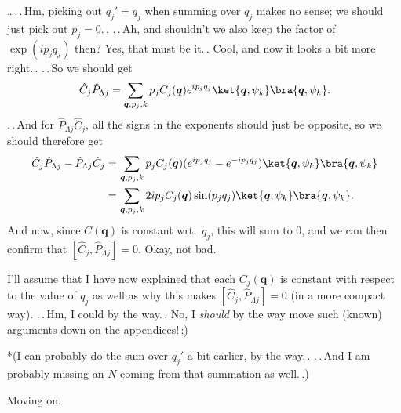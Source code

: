 \documentclass{report}
\begin{document}
\ldots .\,.\,Hm, picking out $q_j' = q_j$ when summing over $q_j$ makes no sense; we should just pick out $p_j = 0$.\,. .\,.\,Ah, and shouldn't we also keep the factor of $\exp(i p_j q_j)$ then? Yes, that must be it.\,. Cool, and now it looks a bit more right.\,. .\,.\,So we should get
\begin{align}
\begin{aligned}
	\hat C_{j} \hat P_{\Lambda j} = 
		\sum_{\boldsymbol{q}, p_j, k}
		p_j C_j(\boldsymbol{q}) e^{i p_j q_j}
		\ket{\boldsymbol{q}, \psi_{k}}
		\bra{\boldsymbol{q}, \psi_{k}}.
\end{aligned}
\end{align} 
.\,.\,And for $\hat P_{\Lambda j} \hat C_{j}$, all the signs in the exponents should just be opposite, so we should therefore get
\begin{align}
\begin{aligned}
	\hat C_{j} \hat P_{\Lambda j} - \hat P_{\Lambda j} \hat C_{j} =&\,
		\sum_{\boldsymbol{q}, p_j, k}
		p_j C_j(\boldsymbol{q}) (e^{i p_j q_j} - e^{-i p_j q_j} )
		\ket{\boldsymbol{q}, \psi_{k}}
		\bra{\boldsymbol{q}, \psi_{k}} 
	\\=&\,
		\sum_{\boldsymbol{q}, p_j, k}
		2i p_j C_j(\boldsymbol{q}) \sin(p_j q_j)
		\ket{\boldsymbol{q}, \psi_{k}}
		\bra{\boldsymbol{q}, \psi_{k}}.
\end{aligned}
\end{align} 
And now, since $C(\boldsymbol{q})$ is constant wrt.\ $q_j$, this will sum to 0, and we can then confirm that $[\hat C_{j}, \hat P_{\Lambda j}] = 0$. Okay, not bad. 

I'll assume that I have now explained that each $C_j(\boldsymbol{q})$ is constant with respect to the value of $q_j$ as well as why this makes $[\hat C_{j}, \hat P_{\Lambda j}] = 0$ (in a more compact way).
.\,.\,Hm, I could by the way.\,. No, I \emph{should} by the way move such (known) arguments down on the appendices!\,:) 

*(I can probably do the sum over $q_j'$ a bit earlier, by the way.\,. .\,.\,And I am probably missing an $N$ coming from that summation as well.\,.)

Moving on.
\end{document}
